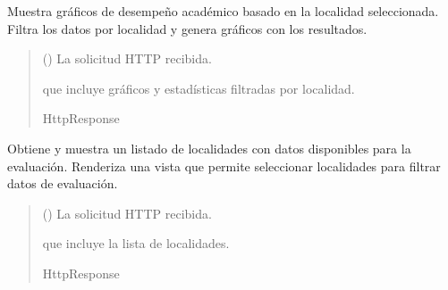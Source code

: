 \documentclass[letterpaper,10pt,spanish]{sphinxmanual}
\begin{document}
\begin{fulllineitems}

\pysigstartsignatures
{}
\pysigstopsignatures
\sphinxAtStartPar
Muestra gráficos de desempeño académico basado en la localidad seleccionada.
Filtra los datos por localidad y genera gráficos con los resultados.
\begin{quote}\begin{description}
\sphinxAtStartPar
{} () \textendash{} La solicitud HTTP recibida.

\sphinxAtStartPar
\begin{description}
\sphinxAtStartPar
que incluye gráficos y estadísticas filtradas por localidad.

\end{description}


\sphinxAtStartPar
HttpResponse

\end{description}\end{quote}

\end{fulllineitems}



\begin{fulllineitems}

\pysigstartsignatures
{}
\pysigstopsignatures
\sphinxAtStartPar
Obtiene y muestra un listado de localidades con datos disponibles para la evaluación.
Renderiza una vista que permite seleccionar localidades para filtrar datos de evaluación.
\begin{quote}\begin{description}
\sphinxAtStartPar
{} () \textendash{} La solicitud HTTP recibida.

\sphinxAtStartPar
\begin{description}
\sphinxAtStartPar
que incluye la lista de localidades.

\end{description}


\sphinxAtStartPar
HttpResponse

\end{description}\end{quote}

\end{fulllineitems}
\end{document}
